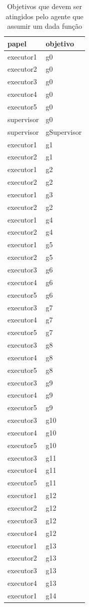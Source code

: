 \documentclass[12pt]{article}
\begin{document}
\begin{table}[H]
\centering
{}
\begin{tabular}{|l|l|}
\hline
\textbf{papel} & \textbf{objetivo} \\ \hline
executor1 & g0 \\ \hline
executor2 & g0 \\ \hline
executor3 & g0 \\ \hline
executor4 & g0 \\ \hline
executor5 & g0 \\ \hline
supervisor & g0 \\ \hline
supervisor & gSupervisor \\ \hline
executor1 & g1 \\ \hline
executor2 & g1 \\ \hline
executor1 & g2 \\ \hline
executor2 & g2 \\ \hline
executor1 & g3 \\ \hline
executor2 & g2 \\ \hline
executor1 & g4 \\ \hline
executor2 & g4 \\ \hline
executor1 & g5 \\ \hline
executor2 & g5 \\ \hline
executor3 & g6 \\ \hline
executor4 & g6 \\ \hline
executor5 & g6 \\ \hline
executor3 & g7 \\ \hline
executor4 & g7 \\ \hline
executor5 & g7 \\ \hline
executor3 & g8 \\ \hline
executor4 & g8 \\ \hline
executor5 & g8 \\ \hline
executor3 & g9 \\ \hline
executor4 & g9 \\ \hline
executor5 & g9 \\ \hline
executor3 & g10 \\ \hline
executor4 & g10 \\ \hline
executor5 & g10 \\ \hline
executor3 & g11 \\ \hline
executor4 & g11 \\ \hline
executor5 & g11 \\ \hline
executor1 & g12 \\ \hline
executor2 & g12 \\ \hline
executor3 & g12 \\ \hline
executor4 & g12 \\ \hline
executor1 & g13 \\ \hline
executor2 & g13 \\ \hline
executor3 & g13 \\ \hline
executor4 & g13 \\ \hline
executor1 & g14 \\ \hline
\end{tabular}
\caption{Objetivos que devem ser atingidos pelo agente que assumir um dada função}
\label{deontic1}
\end{table}
\end{document}
